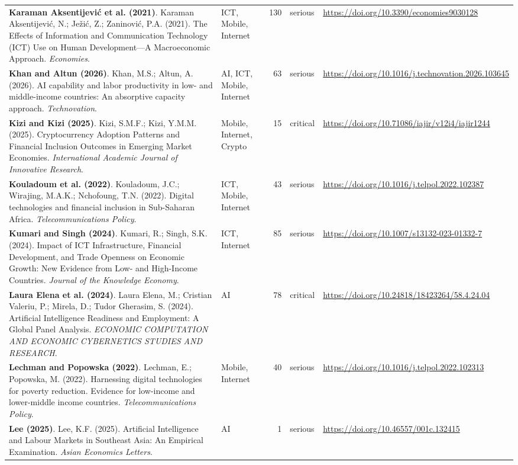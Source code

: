 {\begin{longtable}{@{}p{7.4cm} p{1.3cm} r l p{3.4cm}@{}}
\textbf{Karaman Aksentijević et al. (2021)}. Karaman Aksentijević, N.; Ježić, Z.; Zaninović, P.A. (2021). The Effects of Information and Communication Technology (ICT) Use on Human Development—A Macroeconomic Approach. \emph{Economies}. & ICT, Mobile, Internet & 130 & serious & \url{https://doi.org/10.3390/economies9030128} \\
\textbf{Khan and Altun (2026)}. Khan, M.S.; Altun, A. (2026). AI capability and labor productivity in low- and middle-income countries: An absorptive capacity approach. \emph{Technovation}. & AI, ICT, Mobile, Internet & 63 & serious & \url{https://doi.org/10.1016/j.technovation.2026.103645} \\
\textbf{Kizi and Kizi (2025)}. Kizi, S.M.F.; Kizi, Y.M.M. (2025). Cryptocurrency Adoption Patterns and Financial Inclusion Outcomes in Emerging Market Economies. \emph{International Academic Journal of Innovative Research}. & Mobile, Internet, Crypto & 15 & critical & \url{https://doi.org/10.71086/iajir/v12i4/iajir1244} \\
\textbf{Kouladoum et al. (2022)}. Kouladoum, J.C.; Wirajing, M.A.K.; Nchofoung, T.N. (2022). Digital technologies and financial inclusion in Sub-Saharan Africa. \emph{Telecommunications Policy}. & ICT, Mobile, Internet & 43 & serious & \url{https://doi.org/10.1016/j.telpol.2022.102387} \\
\textbf{Kumari and Singh (2024)}. Kumari, R.; Singh, S.K. (2024). Impact of ICT Infrastructure, Financial Development, and Trade Openness on Economic Growth: New Evidence from Low- and High-Income Countries. \emph{Journal of the Knowledge Economy}. & ICT, Internet & 85 & serious & \url{https://doi.org/10.1007/s13132-023-01332-7} \\
\textbf{Laura Elena et al. (2024)}. Laura Elena, M.; Cristian Valeriu, P.; Mirela, D.; Tudor Gherasim, S. (2024). Artificial Intelligence Readiness and Employment: A Global Panel Analysis. \emph{ECONOMIC COMPUTATION AND ECONOMIC CYBERNETICS STUDIES AND RESEARCH}. & AI & 78 & critical & \url{https://doi.org/10.24818/18423264/58.4.24.04} \\
\textbf{Lechman and Popowska (2022)}. Lechman, E.; Popowska, M. (2022). Harnessing digital technologies for poverty reduction. Evidence for low-income and lower-middle income countries. \emph{Telecommunications Policy}. & Mobile, Internet & 40 & serious & \url{https://doi.org/10.1016/j.telpol.2022.102313} \\
\textbf{Lee (2025)}. Lee, K.F. (2025). Artificial Intelligence and Labour Markets in Southeast Asia: An Empirical Examination. \emph{Asian Economics Letters}. & AI & 1 & serious & \url{https://doi.org/10.46557/001c.132415} \\

\end{longtable}}
